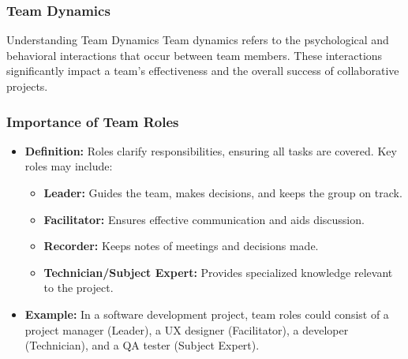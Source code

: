 \documentclass[aspectratio=169]{beamer}
\begin{document}
\begin{frame}[fragile]
    \frametitle{Team Dynamics}
    \begin{block}{Understanding Team Dynamics}
        Team dynamics refers to the psychological and behavioral interactions that occur between team members. These interactions significantly impact a team's effectiveness and the overall success of collaborative projects.
    \end{block}
\end{frame}

\begin{frame}[fragile]
    \frametitle{Importance of Team Roles}
    \begin{itemize}
        \item \textbf{Definition:} Roles clarify responsibilities, ensuring all tasks are covered. Key roles may include:
        \begin{itemize}
            \item \textbf{Leader:} Guides the team, makes decisions, and keeps the group on track.
            \item \textbf{Facilitator:} Ensures effective communication and aids discussion.
            \item \textbf{Recorder:} Keeps notes of meetings and decisions made.
            \item \textbf{Technician/Subject Expert:} Provides specialized knowledge relevant to the project.
        \end{itemize}
        \item \textbf{Example:} In a software development project, team roles could consist of a project manager (Leader), a UX designer (Facilitator), a developer (Technician), and a QA tester (Subject Expert).
    \end{itemize}
\end{frame}
\end{document}
